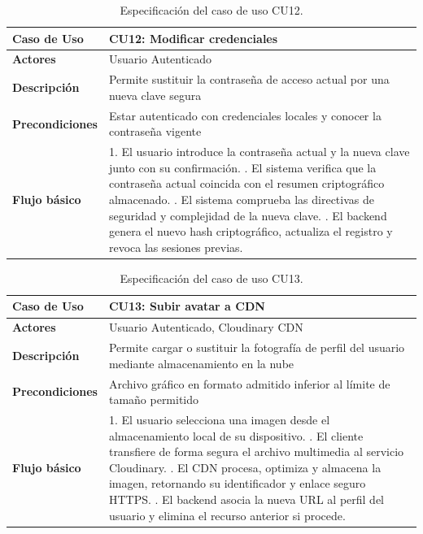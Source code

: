 \begin{table}[H]
\centering
\begin{tabular}{|p{3.1cm}|p{10.9cm}|}
\hline
\textbf{Caso de Uso} & \textbf{CU12: Modificar credenciales} \\ \hline
\textbf{Actores} & Usuario Autenticado \\ \hline
\textbf{Descripción} & Permite sustituir la contraseña de acceso actual por una nueva clave segura \\ \hline
\textbf{Precondiciones} & Estar autenticado con credenciales locales y conocer la contraseña vigente \\ \hline
\textbf{Flujo básico} & 
1. El usuario introduce la contraseña actual y la nueva clave junto con su confirmación. \newline
2. El sistema verifica que la contraseña actual coincida con el resumen criptográfico almacenado. \newline
3. El sistema comprueba las directivas de seguridad y complejidad de la nueva clave. \newline
4. El backend genera el nuevo hash criptográfico, actualiza el registro y revoca las sesiones previas. \\ \hline
\end{tabular}
\caption{Especificación del caso de uso CU12.}
\label{tab:cu12}
\end{table}

\begin{table}[H]
\centering
\begin{tabular}{|p{3.1cm}|p{10.9cm}|}
\hline
\textbf{Caso de Uso} & \textbf{CU13: Subir avatar a CDN} \\ \hline
\textbf{Actores} & Usuario Autenticado, Cloudinary CDN \\ \hline
\textbf{Descripción} & Permite cargar o sustituir la fotografía de perfil del usuario mediante almacenamiento en la nube \\ \hline
\textbf{Precondiciones} & Archivo gráfico en formato admitido inferior al límite de tamaño permitido \\ \hline
\textbf{Flujo básico} & 
1. El usuario selecciona una imagen desde el almacenamiento local de su dispositivo. \newline
2. El cliente transfiere de forma segura el archivo multimedia al servicio Cloudinary. \newline
3. El CDN procesa, optimiza y almacena la imagen, retornando su identificador y enlace seguro HTTPS. \newline
4. El backend asocia la nueva URL al perfil del usuario y elimina el recurso anterior si procede. \\ \hline
\end{tabular}
\caption{Especificación del caso de uso CU13.}
\label{tab:cu13}
\end{table}

